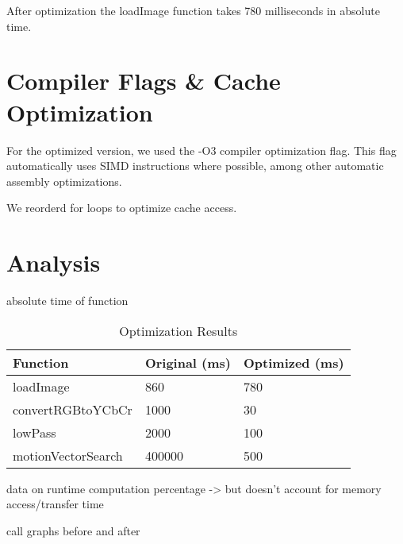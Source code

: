 \documentclass{article}
\begin{document}
After optimization the loadImage function takes 780 milliseconds in absolute time.

\section{Compiler Flags \& Cache Optimization}
For the optimized version, we used the -O3 compiler optimization flag. This flag automatically uses SIMD instructions where possible, among other automatic assembly optimizations.

We reorderd for loops to optimize cache access. %

\section{Analysis}

absolute time of function

\begin{table}[h!]
  \centering
  \begin{tabular}{lll}
    \toprule
    Function & Original (ms) & Optimized (ms) \\
    \midrule
    loadImage & 860 & 780 \\

    convertRGBtoYCbCr & 1000 & 30 \\

    lowPass & 2000 & 100 \\

    motionVectorSearch & 400000 & 500 \\

    \bottomrule
  \end{tabular}
  \caption{Optimization Results}
  \label{tab:results}
\end{table}

data on runtime computation percentage
-> but doesn't account for memory access/transfer time

call graphs before and after
\end{document}
